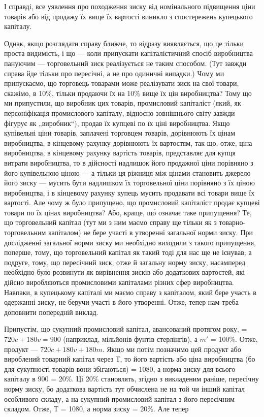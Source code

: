 \parcont{}  %
І справді, все уявлення про походження зиску від номінального
підвищення ціни товарів або від продажу їх вище їх вартості
виникло з спостережень купецького капіталу.

Однак, якщо розглядати справу ближче, то відразу виявляється,
що це тільки проста видимість, і що — коли припускати
капіталістичний спосіб виробництва пануючим — торговельний
зиск реалізується не таким способом. (Тут завжди справа
йде тільки про пересічні, а не про одиничні випадки.) Чому
ми припускаємо, що торговець товарами може реалізувати зиск
на свої товари, скажімо, в 10\%, тільки продаючи їх на 10\%
вище їх цін виробництва? Тому що ми припустили, що виробник
цих товарів, промисловий капіталіст (який, як персоніфікація
промислового капіталу, відносно зовнішнього світу завжди
фігурує як „виробник“), продав їх купцеві по їх ціні виробництва.
Якщо купівельні ціни товарів, заплачені торговцем товарів, дорівнюють
їх цінам виробництва, в кінцевому рахунку дорівнюють
їх вартостям, так що, отже, ціна виробництва, в кінцевому рахунку
вартість товарів, представляє для купця витрати виробництва, то
в дійсності надлишок його продажної ціни порівняно з його купівельною
ціною — а тільки ця ріжниця між цінами становить джерело
його зиску — мусить бути надлишком їх торговельної ціни
порівняно з їх ціною виробництва, і в кінцевому рахунку купець
мусить продавати всі товари вище їх вартості. Але чому ж було
припущено, що промисловий капіталіст продає купцеві товари по
їх цінах виробництва? Або, краще, що́ означає таке припущення?
Те, що торговельний капітал (тут ми з ним маємо справу
ще тільки як з товарно-торговельним капіталом) не бере участі
в утворенні загальної норми зиску. При дослідженні загальної
норми зиску ми необхідно виходили з такого припущення, поперше,
тому, що торговельний капітал як такий тоді для нас
ще не існував; а подруге, тому, що пересічний зиск, отже й загальну
норму зиску, насамперед необхідно було розвинути як
вирівнення зисків або додаткових вартостей, які дійсно виробляються
промисловими капіталами різних сфер виробництва.
Навпаки, в купецькому капіталі ми маємо справу з капіталом,
який бере участь в одержанні зиску, не беручи участі в його
утворенні. Отже, тепер нам треба доповнити попередній виклад.

Припустім, що сукупний промисловий капітал, авансований
протягом року, = $720 c + 180 v = 900$ (наприклад, мільйонів фунтів
стерлінгів), а $m'$ = 100\%. Отже, продукт — $720 c + 180 v + 180 m$.
Якщо ми потім позначимо цей продукт або вироблений товарний
капітал через $Т$, то його вартість або ціна виробництва
(бо для сукупності товарів вони збігаються) = 1080, а норма
зиску для всього капіталу в 900 = 20\%. Ці 20\% становлять,
згідно з викладеним раніше, пересічну норму зиску, бо додаткова
вартість тут обчислена не на той чи інший капітал особливого
складу, а на сукупний промисловий капітал з його пересічним
складом. Отже, $Т$ = 1080, а норма зиску = 20\%. Але тепер
\parbreak{}  %

